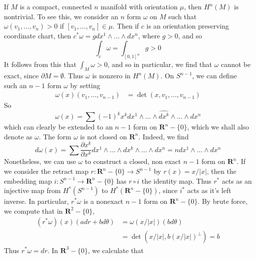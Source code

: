 \begin{example}
    If $M$ is a compact, connected $n$ manifold with orientation $\mu$, then $H^n(M)$ is nontrivial. To see this, we consider an $n$ form $\omega$ on $M$ such that $\omega(v_1, \dots, v_n) > 0$ if $[v_1, \dots, v_n] \in \mu$. Then if $c$ is an orientation preserving coordinate chart, then $c^* \omega = g dx^1 \wedge \dots \wedge dx^n$, where $g > 0$, and so
    \[ \int_c \omega = \int_{[0,1]^n} g > 0 \]
    It follows from this that $\int_M \omega > 0$, and so in particular, we find that $\omega$ cannot be exact, since $\partial M = \emptyset$. Thus $\omega$ is nonzero in $H^n(M)$. On $S^{n-1}$, we can define such an $n-1$ form $\omega$ by setting
    \begin{align*}
        \omega(x)(v_1, \dots, v_{n-1}) &= \det(x,v_1, \dots, v_{n-1})
    \end{align*}
    So
    \[ \omega(x) = \sum (-1)^k x^k dx^1 \wedge \dots \wedge \widehat{dx^k} \wedge \dots \wedge dx^n \]
    which can clearly be extended to an $n-1$ form on $\mathbf{R}^n - \{ 0 \}$, which we shall also denote as $\omega$. The form $\omega$ is not closed on $\mathbf{R}^n$. Indeed, we find
    \[ d\omega(x) = \sum \frac{\partial x^k}{\partial x^k} dx^1 \wedge \dots \wedge dx^k \wedge \dots \wedge dx^n = n dx^1 \wedge \dots \wedge dx^n \]
    Nonetheless, we can use $\omega$ to construct a closed, non exact $n-1$ form on $\mathbf{R}^n$. If we consider the retract map $r: \mathbf{R}^n - \{ 0 \} \to S^{n-1}$ by $r(x) = x/|x|$, then the embedding map $i: S^{n-1} \to \mathbf{R}^n - \{ 0 \}$ has $r \circ i$ the identity map. Thus $r^*$ acts as an injective map from $H^*(S^{n-1})$ to $H^*(\mathbf{R}^n - \{ 0 \})$, since $i^*$ acts as it's left inverse. In particular, $r^* \omega$ is a nonexact $n-1$ form on $\mathbf{R}^n - \{ 0 \}$. By brute force, we compute that in $\mathbf{R}^2 - \{ 0 \}$,
    \begin{align*}
        (r^* \omega)(x)(a dr + b d \theta) &= \omega(x/|x|)(b d \theta)\\
        & = \det(x/|x|,b(x/|x|)^\perp) = b
    \end{align*}
    Thus $r^* \omega = dr$. In $\mathbf{R}^3 - \{ 0 \}$, we calculate that
\end{example}













